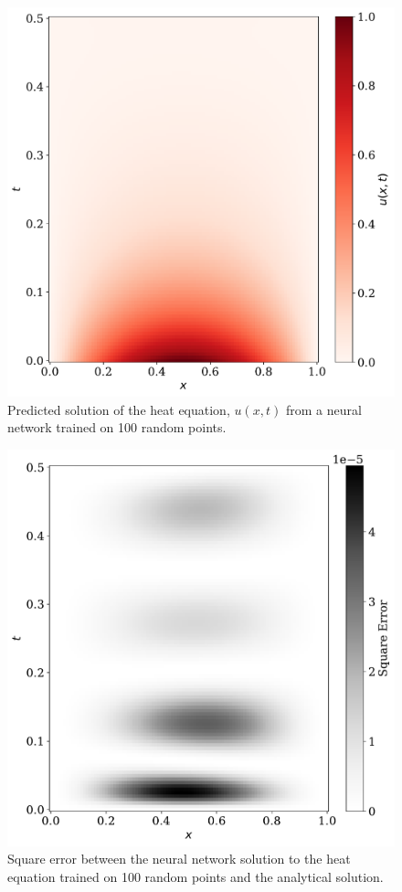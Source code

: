 \documentclass[a4paper, 
amsfonts, 
amssymb, 
amsmath, 
reprint, 
showkeys, 
nofootinbib, 
twoside]{revtex4-2}
\begin{document}
\begin{figure}
    \centering
    \includegraphics[width=.9\columnwidth]{Figures/nn_pred100.pdf}
    \caption{ Predicted solution of the heat equation, $u(x, t)$ from a neural network trained on 100 random points. }
    \label{fig:nn_pred_100}
\end{figure}

\begin{figure}
    \centering
    \includegraphics[width=.9\columnwidth]{Figures/nn_sqr_err100.pdf}
    \caption{ Square error between the neural network solution to the heat equation trained on 100 random points and the analytical solution.}
    \label{fig:nn_sqr_err_100}
\end{figure}
\end{document}
